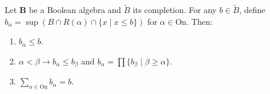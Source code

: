 Let $\mathbf{B}$ be a Boolean algebra and $\tilde{B}$ its completion. For any $b \in \tilde{B}$, define $b_{\alpha} = \sup (B \cap R(\alpha) \cap \{x \mid x \leq b\})$ for $\alpha \in \mathrm{On}$. Then:

\begin{enumerate}
\item $b_{\alpha} \leq b$.
\item $\alpha < \beta \rightarrow b_{\alpha} \leq b_{\beta}$ and $b_{\alpha} = \prod \{b_{\beta} \mid \beta \geq \alpha\}$.
\item $\sum_{\alpha \in \mathrm{On}} b_{\alpha} = b$.
\end{enumerate}
